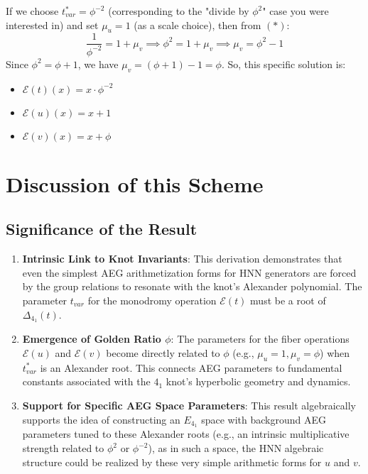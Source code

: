 \documentclass[12pt, a4paper]{article}
\begin{document}
If we choose $t_{var}^* = \phi^{-2}$ (corresponding to the "divide by $\phi^2$" case you were interested in) and set $\mu_u=1$ (as a scale choice), then from $(*)$:
$$ \frac{1}{\phi^{-2}} = 1 + \mu_v \implies \phi^2 = 1 + \mu_v \implies \mu_v = \phi^2 - 1 $$
Since $\phi^2 = \phi+1$, we have $\mu_v = (\phi+1) - 1 = \phi$.
So, this specific solution is:
\begin{itemize}
    \item $\mathcal{E}(t)(x) = x \cdot \phi^{-2}$
    \item $\mathcal{E}(u)(x) = x + 1$
    \item $\mathcal{E}(v)(x) = x + \phi$
\end{itemize}

\section{Discussion of this Scheme}

\subsection{Significance of the Result}
\begin{enumerate}
    \item \textbf{Intrinsic Link to Knot Invariants}: This derivation demonstrates that even the simplest AEG arithmetization forms for HNN generators are forced by the group relations to resonate with the knot's Alexander polynomial. The parameter $t_{var}$ for the monodromy operation $\mathcal{E}(t)$ must be a root of $\Delta_{4_1}(t)$.
    \item \textbf{Emergence of Golden Ratio $\phi$}: The parameters for the fiber operations $\mathcal{E}(u)$ and $\mathcal{E}(v)$ become directly related to $\phi$ (e.g., $\mu_u=1, \mu_v=\phi$) when $t_{var}^*$ is an Alexander root. This connects AEG parameters to fundamental constants associated with the $4_1$ knot's hyperbolic geometry and dynamics.
    \item \textbf{Support for Specific AEG Space Parameters}: This result algebraically supports the idea of constructing an $E_{4_1}$ space with background AEG parameters tuned to these Alexander roots (e.g., an intrinsic multiplicative strength related to $\phi^2$ or $\phi^{-2}$), as in such a space, the HNN algebraic structure could be realized by these very simple arithmetic forms for $u$ and $v$.
\end{enumerate}
\end{document}
